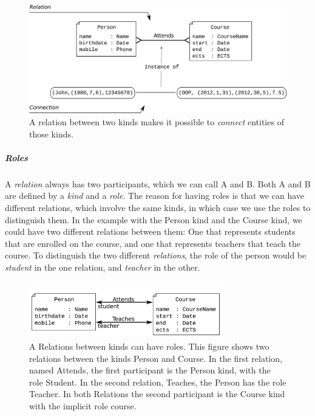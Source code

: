 \begin{figure}[h]
	\centering
	\includegraphics[scale=0.4]{img/relationAndConnection.pdf}
	\caption{A relation between two kinds makes it possible to \emph{connect} entities of those kinds.}
	\label{fig:relationAndConnection}
\end{figure}


\subparagraph{Roles}

A \emph{relation} always has two participants, which we can call A
and B. Both A and B are defined by a \emph{kind} and a \emph{role}.
The reason for having roles is that we can have different relations,
which involve the same kinds, in which case we use the roles to distinguish
them. In the example with the Person kind and the Course kind, we
could have two different relations between them: One that represents
students that are enrolled on the course, and one that represents
teachers that teach the course. To distinguish the two different \emph{relations},
the role of the person would be \emph{student} in the one relation,
and \emph{teacher} in the other. 

\begin{figure}[h]
	\centering
	\includegraphics[width=0.75\textwidth]{img/relationRoles.pdf}
	\caption{A Relations between kinds can have roles. This figure shows two relations between the kinds Person and Course. In the first relation, named Attends, the first participant is the Person kind, with the role Student. In the second relation, Teaches, the Person has the role Teacher. In both Relations the second participant is the Course kind with the implicit role course.}
	\label{fig:relationRoles}
\end{figure}

